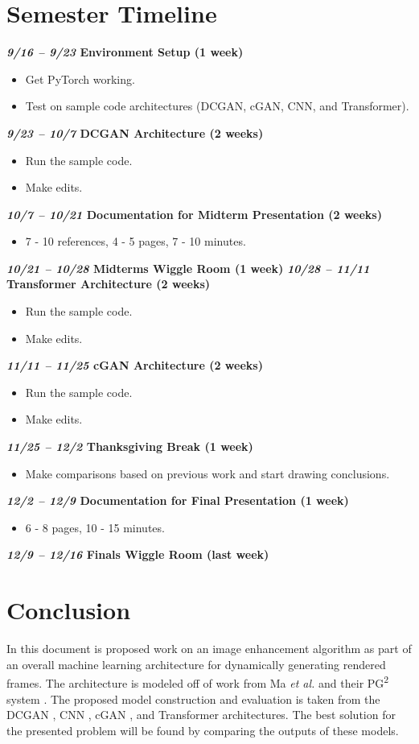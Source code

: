 \documentclass[letterpaper]{article} %
\begin{document}
\section{Semester Timeline}
\label{subsec:semester_plan}
\textbf{\textit{9/16 -- 9/23} Environment Setup (1 week)}
\begin{itemize}
\item Get PyTorch working.
\item Test on sample code architectures (DCGAN, cGAN, CNN, and Transformer).
\end{itemize}
\textbf{\textit{9/23 -- 10/7} DCGAN Architecture (2 weeks)}
\begin{itemize}
\item Run the sample code.
\item Make edits.
\end{itemize}
\textbf{\textit{10/7 -- 10/21} Documentation for Midterm Presentation (2 weeks)}
\begin{itemize}
\item 7 - 10 references, 4 - 5 pages, 7 - 10 minutes.
\end{itemize}
\textbf{\textit{10/21 -- 10/28} Midterms Wiggle Room (1 week)}
\textbf{\textit{10/28 -- 11/11} Transformer Architecture (2 weeks)}
\begin{itemize}
\item Run the sample code.
\item Make edits.
\end{itemize}
\textbf{\textit{11/11 -- 11/25} cGAN Architecture (2 weeks)}
\begin{itemize}
\item Run the sample code.
\item Make edits.
\end{itemize}
\textbf{\textit{11/25 -- 12/2} Thanksgiving Break (1 week)}
\begin{itemize}
\item Make comparisons based on previous work and start drawing conclusions.
\end{itemize}
\textbf{\textit{12/2 -- 12/9} Documentation for Final Presentation (1 week)}
\begin{itemize}
\item 6 - 8 pages, 10 - 15 minutes.
\end{itemize}
\textbf{\textit{12/9 -- 12/16} Finals Wiggle Room (last week)}

\section{Conclusion}
\label{sec:conclusion}
In this document is proposed work on an image enhancement algorithm as
part of an overall machine learning architecture for dynamically
generating rendered frames. The architecture is modeled off of work from
Ma \textit{et al.} and their PG\textsuperscript{2} system
\cite{pose_guided_image_generation}.
The proposed model construction and evaluation is taken from
the DCGAN \cite{unsupervised_learning},
CNN \cite{pixelcnn++},
cGAN \cite{image_to_image},
and Transformer \cite{generative_transformers} architectures.
The best solution for the presented problem will be found
by comparing the outputs of these models.
\end{document}
